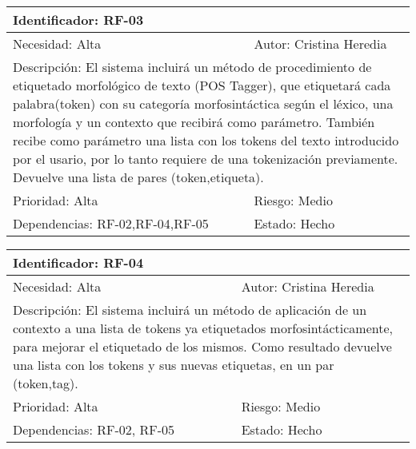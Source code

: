 \begin{table}[H]
\label{my-label}
\begin{tabular}{|l|l|l|l|l|l|l|}
\hline
\multicolumn{7}{|l|}{\textcolor{SchoolColor}{Identificador:} RF-03}                                 \\ \hline
\multicolumn{4}{|l|}{\textcolor{SchoolColor}{Necesidad:} Alta} & \multicolumn{3}{l|}{\textcolor{SchoolColor}{Autor:} Cristina Heredia}         \\ \hline
\multicolumn{7}{|L|}{\textcolor{SchoolColor}{Descripción:} El sistema incluirá un método de procedimiento de etiquetado morfológico de texto (POS Tagger), que etiquetará cada palabra(token) con su categoría morfosintáctica según el léxico, una morfología y un contexto que recibirá como parámetro.  También recibe como parámetro una lista con los tokens del texto introducido por el usario, por lo tanto requiere de una tokenización previamente. Devuelve una lista de pares (token,etiqueta).  }                                 \\ \hline
\multicolumn{4}{|l|}{\textcolor{SchoolColor}{Prioridad: }Alta} & \multicolumn{3}{l|}{\textcolor{SchoolColor}{Riesgo:} Medio}         \\ \hline
\multicolumn{5}{|l|}{\textcolor{SchoolColor}{Dependencias: }RF-02,RF-04,RF-05}         & \multicolumn{2}{l|}{\textcolor{SchoolColor}{Estado:} Hecho} \\ \hline
\end{tabular}
\end{table}

\begin{table}[H]
\label{my-label}
\begin{tabular}{|l|l|l|l|l|l|l|}
\hline
\multicolumn{7}{|l|}{\textcolor{SchoolColor}{Identificador:} RF-04}                                 \\ \hline
\multicolumn{4}{|l|}{\textcolor{SchoolColor}{Necesidad:} Alta} & \multicolumn{3}{l|}{\textcolor{SchoolColor}{Autor:} Cristina Heredia}         \\ \hline
\multicolumn{7}{|L|}{\textcolor{SchoolColor}{Descripción:} El sistema incluirá un método de aplicación de un contexto a una lista de tokens ya etiquetados morfosintácticamente, para mejorar el etiquetado de los mismos. Como resultado devuelve una lista con los tokens y sus nuevas etiquetas, en un par (token,tag).}                                 \\ \hline
\multicolumn{4}{|l|}{\textcolor{SchoolColor}{Prioridad: }Alta} & \multicolumn{3}{l|}{\textcolor{SchoolColor}{Riesgo:} Medio}         \\ \hline
\multicolumn{5}{|l|}{\textcolor{SchoolColor}{Dependencias: } RF-02, RF-05}         & \multicolumn{2}{l|}{\textcolor{SchoolColor}{Estado:} Hecho} \\ \hline
\end{tabular}
\end{table}

